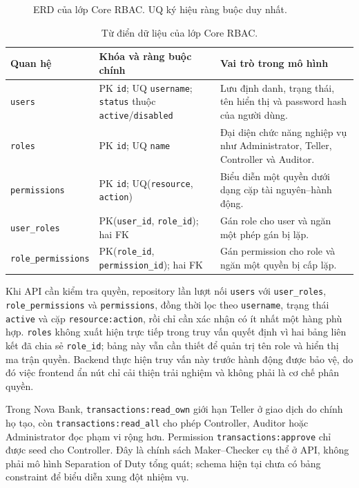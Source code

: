 \begin{figure}[htbp]
\centering
\resizebox{\textwidth}{!}{}
\caption{ERD của lớp Core RBAC. UQ ký hiệu ràng buộc duy nhất.}
\label{fig:rbac-core-erd}
\end{figure}

\begin{table}[htbp]
\centering
\small
\begin{tabularx}{\textwidth}{p{}p{}X}
\toprule
Quan hệ & Khóa và ràng buộc chính & Vai trò trong mô hình \\
\midrule
\texttt{users} & PK \texttt{id}; UQ \texttt{username}; \texttt{status} thuộc \texttt{active}/\texttt{disabled} & Lưu định danh, trạng thái, tên hiển thị và password hash của người dùng. \\
\texttt{roles} & PK \texttt{id}; UQ \texttt{name} & Đại diện chức năng nghiệp vụ như Administrator, Teller, Controller và Auditor. \\
\texttt{permissions} & PK \texttt{id}; UQ(\texttt{resource}, \texttt{action}) & Biểu diễn một quyền dưới dạng cặp tài nguyên--hành động. \\
\texttt{user\_roles} & PK(\texttt{user\_id}, \texttt{role\_id}); hai FK & Gán role cho user và ngăn một phép gán bị lặp. \\
\texttt{role\_permissions} & PK(\texttt{role\_id}, \texttt{permission\_id}); hai FK & Gán permission cho role và ngăn một quyền bị cấp lặp. \\
\bottomrule
\end{tabularx}
\caption{Từ điển dữ liệu của lớp Core RBAC.}
\label{tab:rbac-core-schema}
\end{table}

Khi API cần kiểm tra quyền, repository lần lượt nối \texttt{users} với
\texttt{user\_roles}, \texttt{role\_}\allowbreak\texttt{permissions} và
\texttt{permissions},
đồng thời lọc theo \texttt{username}, trạng thái
\texttt{active} và cặp \texttt{resource:action}, rồi chỉ cần xác nhận có ít
nhất một hàng phù hợp. \texttt{roles} không xuất hiện trực tiếp trong truy vấn
quyết định vì hai bảng liên kết đã chia sẻ \texttt{role\_id}; bảng này vẫn cần
thiết để quản trị tên role và hiển thị ma trận quyền. Backend thực hiện truy vấn
này trước hành động được bảo vệ, do đó việc frontend ẩn nút chỉ cải thiện trải
nghiệm và không phải là cơ chế phân quyền.

Trong Nova Bank, \texttt{transactions:read\_own} giới hạn Teller ở giao dịch
do chính họ tạo, còn \texttt{transactions:read\_all} cho phép Controller,
Auditor hoặc Administrator đọc phạm vi rộng hơn. Permission
\texttt{transactions:approve} chỉ được seed cho Controller. Đây là chính sách
Maker--Checker cụ thể ở API, không phải mô hình Separation of Duty tổng quát;
schema hiện tại chưa có bảng constraint để biểu diễn xung đột nhiệm vụ.

